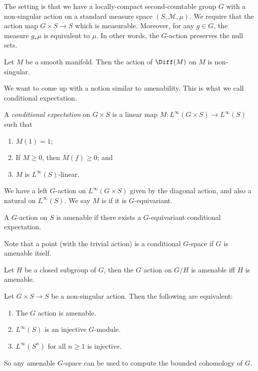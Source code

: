 \documentclass[a4paper]{article}
\begin{document}
The setting is that we have a locally-compact second-countable group $G$ with a non-singular action on a standard measure space $(S, \mathcal{M}, \mu)$. We require that the action map $G \times S \to S$ which is measurable. Moreover, for any $g \in G$, the measure $g_* \mu$ is equivalent to $\mu$. In other words, the $G$-action preserves the null sets.

\begin{eg}
  Let $M$ be a smooth manifold. Then the action of $\Diff(M)$ on $M$ is non-singular.
\end{eg}

We want to come up with a notion similar to amenability. This is what we call conditional expectation.
\begin{defi}
  A \emph{conditional expectation} on $G \times S$ is a linear map $M: L^\infty(G \times S) \to L^\infty(S)$ such that
  \begin{enumerate}
    \item $M(1) = 1$;
    \item If $M \geq 0$, then $M(f) \geq 0$; and
    \item $M$ is $L^\infty(S)$-linear.
  \end{enumerate}
\end{defi}
We have a left $G$-action on $L^\infty(G \times S)$ given by the diagonal action, and also a natural on $L^\infty(S)$. We say $M$ is  if it is $G$-equivariant.

\begin{defi}
  A $G$-action on $S$ is amenable if there exists a $G$-equivariant conditional expectation.
\end{defi}
Note that a point (with the trivial action) is a conditional $G$-space if $G$ is amenable itself.

\begin{eg}
  Let $H$ be a closed subgroup of $G$, then the $G$ action on $G/H$ is amenable iff $H$ is amenable.
\end{eg}

\begin{thm}
  Let $G \times S \to S$ be a non-singular action. Then the following are equivalent:
  \begin{enumerate}
    \item The $G$ action is amenable.
    \item $L^\infty(S)$ is an injective $G$-module.
    \item $L^\infty(S^n)$ for all $n \geq 1$ is injective.
  \end{enumerate}
\end{thm}
So any amenable $G$-space can be used to compute the bounded cohomology of $G$.
\end{document}
